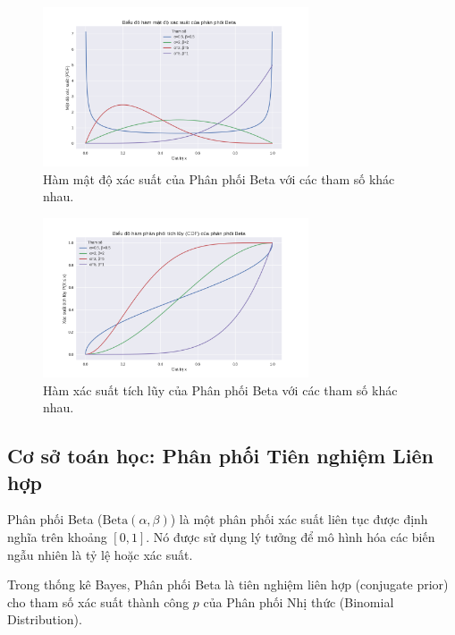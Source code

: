 	\begin{figure}[h!]
		\centering
		\includegraphics[width=0.7\textwidth]{images/Beta Distribution-PDF.png} %
		\caption{Hàm mật độ xác suất của Phân phối Beta với các tham số khác nhau.}
		\label{fig:Beta Distribution-PDF}
	\end{figure}
\newpage	
	\begin{figure}[h!]
		\centering
		\includegraphics[width=0.7\textwidth]{images/Beta Distribution-CDF.png} %
		\caption{Hàm xác suất tích lũy của Phân phối Beta với các tham số khác nhau.}
		\label{fig:Beta Distribution-CDF}
	\end{figure}
	

\subsection{Cơ sở toán học: Phân phối Tiên nghiệm Liên hợp}

Phân phối Beta ($\text{Beta}(\alpha, \beta)$) là một phân phối xác suất liên tục được định nghĩa trên khoảng $[0, 1]$. Nó được sử dụng lý tưởng để mô hình hóa các biến ngẫu nhiên là tỷ lệ hoặc xác suất.

Trong thống kê Bayes, Phân phối Beta là tiên nghiệm liên hợp (conjugate prior) cho tham số xác suất thành công $p$ của Phân phối Nhị thức (Binomial Distribution).

